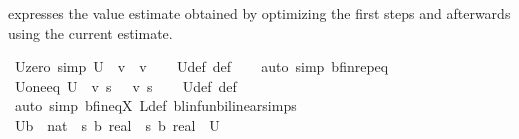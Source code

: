 \begin{isabellebody}
\begin{isamarkuptext}%
 expresses the value estimate obtained by optimizing the first  steps and 
  afterwards using the current estimate.%
\end{isamarkuptext}\isamarkuptrue%
\isamarkupfalse%
\ U{\isacharunderscore}{\kern0pt}zero\ {\isacharbrackleft}{\kern0pt}simp{\isacharbrackright}{\kern0pt}{\isacharcolon}{\kern0pt}\ {\isachardoublequoteopen}U\ {}\ v\ {\isacharequal}{\kern0pt}\ v{\isachardoublequoteclose}\isanewline
%
\isadelimproof
\ \ %
\endisadelimproof
%
\isatagproof
{}\isamarkupfalse%
\ U{\isacharunderscore}{\kern0pt}def\ {\isasymL}{\isacharunderscore}{\kern0pt}def\isanewline
\ \ \isamarkupfalse%
\ {\isacharparenleft}{\kern0pt}auto\ simp{\isacharcolon}{\kern0pt}\ {\isasymnu}\isactrlsub b{\isacharunderscore}{\kern0pt}fin{\isachardot}{\kern0pt}rep{\isacharunderscore}{\kern0pt}eq{\isacharparenright}{\kern0pt}%
\endisatagproof
{\isafoldproof}%
%
\isadelimproof
\isanewline
%
\endisadelimproof
\isanewline
{}\isamarkupfalse%
\ U{\isacharunderscore}{\kern0pt}one{\isacharunderscore}{\kern0pt}eq{\isacharunderscore}{\kern0pt}{\isasymL}{\isacharcolon}{\kern0pt}\ {\isachardoublequoteopen}U\ {}\ v\ s\ {\isacharequal}{\kern0pt}\ {\isasymL}\ v\ s{\isachardoublequoteclose}\isanewline
%
\isadelimproof
\ \ %
\endisadelimproof
%
\isatagproof
{}\isamarkupfalse%
\ U{\isacharunderscore}{\kern0pt}def\ {\isasymL}{\isacharunderscore}{\kern0pt}def\ \isanewline
\ \ \isamarkupfalse%
\ {\isacharparenleft}{\kern0pt}auto\ simp{\isacharcolon}{\kern0pt}\ {\isasymnu}\isactrlsub b{\isacharunderscore}{\kern0pt}fin{\isacharunderscore}{\kern0pt}eq{\isacharunderscore}{\kern0pt}{\isasymP}\isactrlsub X\ L{\isacharunderscore}{\kern0pt}def\ blinfun{\isachardot}{\kern0pt}bilinear{\isacharunderscore}{\kern0pt}simps{\isacharparenright}{\kern0pt}%
\endisatagproof
{\isafoldproof}%
%
\isadelimproof
\isanewline
%
\endisadelimproof
\isanewline
{}\isamarkupfalse%
\ U\isactrlsub b\ {\isacharcolon}{\kern0pt}{\isacharcolon}{\kern0pt}\ {\isachardoublequoteopen}nat\ {\isasymRightarrow}\ {\isacharparenleft}{\kern0pt}{\isacharprime}{\kern0pt}s\ {\isasymRightarrow}\isactrlsub b\ real{\isacharparenright}{\kern0pt}\ {\isasymRightarrow}\ {\isacharparenleft}{\kern0pt}{\isacharprime}{\kern0pt}s\ {\isasymRightarrow}\isactrlsub b\ real{\isacharparenright}{\kern0pt}{\isachardoublequoteclose}\ \ U\isanewline
%
\isadelimproof
%
\endisadelimproof

\end{isabellebody}
